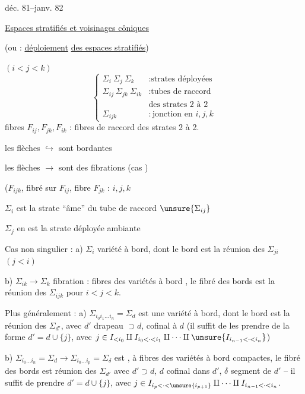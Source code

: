 déc. 81--janv. 82

\uline{Espaces stratifiés et voisinages côniques}

(ou : \uline{déploiement} \uline{des espaces stratifiés})


$(i<j<k)$
\[
\left\{\begin{array}{ll}
\Sigma_i\ \Sigma_j\ \Sigma_k &: \text{strates déployées}\\
\Sigma_{ij}\ \Sigma_{jk}\ \Sigma_{ik} &: \text{tubes de raccord}\\
&\text{des strates 2 à 2}\\
\Sigma_{ijk} &: \text{jonction en }i,j,k
\end{array}\right.
\]
fibres $F_{ij},F_{jk},F_{ik}$ : fibres de raccord
 des strates 2 à 2.

les flèches $\hookrightarrow$ sont bordantes

les flèches $\longrightarrow$ sont des fibrations 
(cas )

($F_{ijk}$, fibré sur $F_{ij}$, fibre $F_{jk}$ : 
 $i,j,k$

$\Sigma_i$ est la strate  ``âme'' du tube de raccord $\unsure{\Sigma_{ij}}$

$\Sigma_j$ en est la strate déployée ambiante

Cas non singulier : a) $\Sigma_i$ variété à bord, dont le bord est
la réunion des $\Sigma_{ji}$ $(j<i)$

b) $\Sigma_{ik}\longrightarrow\Sigma_k$ fibration : fibres des
variétés à bord , le fibré des bords est
la réunion des $\Sigma_{ijk}$ pour $i<j<k$.

Plus généralement : a) $\Sigma_{i_0i_1\ldots i_n}=\Sigma_d$ est une
variété à bord, dont le bord est la réunion des
$\Sigma_{d'}$, avec $d'$ drapeau $\supset d$, cofinal à $d$
(il suffit de les prendre de la forme $d'=d\cup\{j\}$,
avec $j\in I_{<i_0}\amalg I_{i_0<\cdot<i_1}\amalg\cdots\amalg\unsure{I_{i_{n-1}<\cdot<i_n}}$)

b) $\Sigma_{i_0\ldots i_n}=\Sigma_d\longrightarrow\Sigma_{i_0\ldots i_p}=\Sigma_\delta$
est , à fibres des variétés à bord compactes,
le fibré des bords est réunion des $\Sigma_{d'}$
avec $d'\supset d$, $d$ cofinal dans $d'$, $\delta$ segment 
de $d'$ -- il suffit de prendre $d'=d\cup\{j\}$, avec
$j\in I_{i_p<\cdot<\unsure{i_{p+1}}}\amalg\cdots\amalg I_{i_{n-1}<\cdot<i_n}$.

